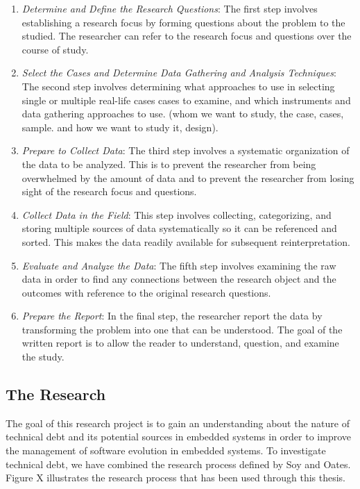 \begin{enumerate}
	\item \textit{Determine and Define the Research Questions}: The first step involves establishing a research focus by forming questions about the problem to the studied. The researcher can refer to the research focus and questions over the course of study. 
	\item \textit{Select the Cases and Determine Data Gathering and Analysis Techniques}: The second step involves determining what approaches to use in selecting single or multiple real-life cases cases to examine, and which instruments and data gathering approaches to use. (whom we want to study, the case, cases, sample. and how we want to study it, design).
	\item \textit{Prepare to Collect Data}: The third step involves a systematic organization of the data to be analyzed. This is to prevent the researcher from being overwhelmed by the amount of data and to prevent the researcher from losing sight of the research focus and questions. 
	\item \textit{Collect Data in the Field}: This step involves collecting, categorizing, and storing multiple sources of data systematically so it can be referenced and sorted. This makes the data readily available for subsequent reinterpretation. 
	\item \textit{Evaluate and Analyze the Data}: The fifth step involves examining the raw data in order to find any connections between the research object and the outcomes with reference to the original research questions. 
	\item \textit{Prepare the Report}: In the final step, the researcher report the data by transforming the problem into one that can be understood. The goal of the written report is to allow the reader to understand, question, and examine the study.
\end{enumerate}


\subsection{The Research}
The goal of this research project is to gain an understanding about the nature of technical debt and its potential sources in embedded systems in order to improve the management of software evolution in embedded systems. To investigate technical debt, we have combined the research process defined by Soy\cite{soysusan} and Oates\cite{Oates:2006:RIS:1202299}. Figure X illustrates the research process that has been used through this thesis.

